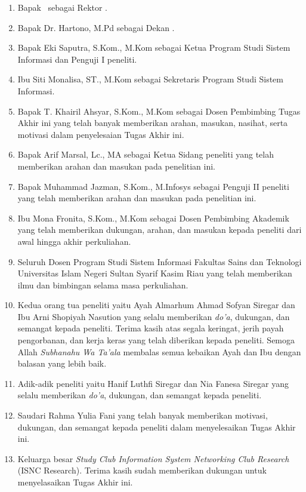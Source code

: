 \begin{enumerate}
	\item Bapak \rektor\ sebagai Rektor \universitas.
	\item Bapak Dr. Hartono, M.Pd sebagai Dekan \fakultas.
	\item Bapak Eki Saputra, S.Kom., M.Kom sebagai Ketua Program Studi Sistem Informasi dan Penguji I peneliti.
	\item Ibu Siti Monalisa, ST., M.Kom sebagai Sekretaris Program Studi Sistem Informasi.
	\item Bapak T. Khairil Ahsyar, S.Kom., M.Kom sebagai Dosen Pembimbing Tugas Akhir ini yang telah banyak memberikan arahan, masukan, nasihat, serta motivasi dalam penyelesaian Tugas Akhir ini.
	\item Bapak Arif Marsal, Lc., MA sebagai Ketua Sidang peneliti yang telah memberikan arahan dan masukan pada penelitian ini.
	\item Bapak Muhammad Jazman, S.Kom., M.Infosys sebagai Penguji II peneliti yang telah memberikan arahan dan masukan pada penelitian ini.
	\item Ibu Mona Fronita, S.Kom., M.Kom sebagai Dosen Pembimbing Akademik yang telah memberikan dukungan, arahan, dan masukan kepada peneliti dari awal hingga akhir perkuliahan.
	\item Seluruh Dosen Program Studi Sistem Informasi Fakultas Sains dan Teknologi Universitas Islam Negeri Sultan Syarif Kasim Riau yang telah memberikan ilmu dan bimbingan selama masa perkuliahan.
	\item Kedua orang tua peneliti yaitu Ayah Almarhum Ahmad Sofyan Siregar dan Ibu Arni Shopiyah Nasution yang selalu memberikan \textit{do'a}, dukungan, dan semangat kepada peneliti. Terima kasih atas segala keringat, jerih payah pengorbanan, dan kerja keras yang telah diberikan kepada peneliti. Semoga Allah \textit{Subhanahu Wa Ta’ala} membalas semua kebaikan Ayah dan Ibu dengan balasan yang lebih baik.
	\item Adik-adik peneliti yaitu Hanif Luthfi Siregar dan Nia Fanesa Siregar yang selalu memberikan \textit{do'a}, dukungan, dan semangat kepada peneliti.
	\item Saudari Rahma Yulia Fani yang telah banyak memberikan motivasi, dukungan, dan semangat kepada peneliti dalam menyelesaikan Tugas Akhir ini.
	\item Keluarga besar \textit{Study Club Information System Networking Club Research} (ISNC Research). Terima kasih sudah memberikan dukungan untuk menyelasaikan Tugas Akhir ini.

\end{enumerate}
